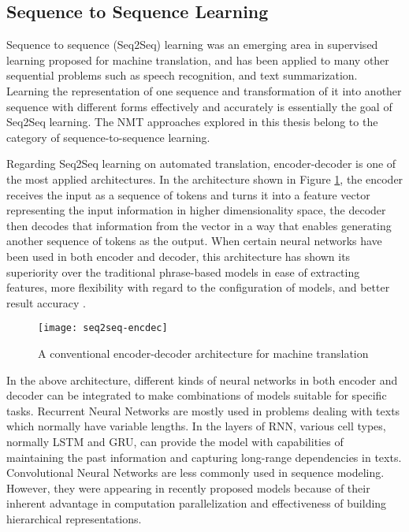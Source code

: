 \subsection{Sequence to Sequence Learning} \label{subsection:seq2seq learning}
Sequence to sequence (Seq2Seq) learning \cite{Sutskever2014} \cite{Cho2014} was an emerging area in supervised learning proposed for machine translation, and has been applied to many other sequential problems such as speech recognition, and text summarization. Learning the representation of one sequence and transformation of it into another sequence with different forms effectively and accurately is essentially the goal of Seq2Seq learning. The NMT approaches explored in this thesis belong to the category of sequence-to-sequence learning.

Regarding Seq2Seq learning on automated translation, encoder-decoder is one of the most applied architectures. In the architecture shown in Figure \ref{figure:encoder-decoder}, the encoder receives the input as a sequence of tokens and turns it into a feature vector representing the input information in higher dimensionality space, the decoder then decodes that information from the vector in a way that enables generating another sequence of tokens as the output. When certain neural networks have been used in both encoder and decoder, this architecture has shown its superiority over the traditional phrase-based models in ease of extracting features, more flexibility with regard to the configuration of models, and better result accuracy \cite{Wu2016}.

\begin{figure}[h]
\texttt{[image: seq2seq-encdec]}
\centering
\caption{A conventional encoder-decoder architecture for machine translation}
\label{figure:encoder-decoder}
\end{figure}

In the above architecture, different kinds of neural networks in both encoder and decoder can be integrated to make combinations of models suitable for specific tasks. Recurrent Neural Networks are mostly used in problems dealing with texts which normally have variable lengths. In the layers of RNN, various cell types, normally LSTM and GRU, can provide the model with capabilities of maintaining the past information and capturing long-range dependencies in texts. Convolutional Neural Networks are less commonly used in sequence modeling. However, they were appearing in recently proposed models because of their inherent advantage in computation parallelization and effectiveness of building hierarchical representations. 

